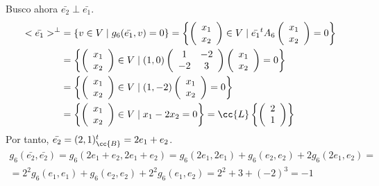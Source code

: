 \begin{ejercicio}
\begin{enumerate}
        Busco ahora $\bar{e_2} \perp \bar{e_1}$.
        \begin{equation*}\begin{split}
            <\bar{e_1}>^\perp &= \{v \in V \mid g_6(\bar{e_1},v) = 0\} 
            = \left\{ \left(\begin{array}{c}
                 x_1 \\ x_2
            \end{array} \right) \in V \mid \bar{e_1}^t A_6
            \left(\begin{array}{c}
                 x_1 \\ x_2
            \end{array} \right) = 0\right\} \\
            &= \left\{ \left(\begin{array}{c}
                 x_1 \\ x_2
            \end{array} \right) \in V \mid (1,0)\left(\begin{array}{cc}
                1 & -2 \\
                -2 & 3
            \end{array} \right) 
            \left(\begin{array}{c}
                 x_1 \\ x_2
            \end{array} \right) = 0\right\} \\
            &= \left\{ \left(\begin{array}{c}
                 x_1 \\ x_2
            \end{array} \right) \in V \mid (1,-2)
            \left(\begin{array}{c}
                 x_1 \\ x_2
            \end{array} \right) = 0\right\} \\
            &= \left\{ \left(\begin{array}{c}
                 x_1 \\ x_2
            \end{array} \right) \in V \mid x_1-2x_2 = 0\right\}
            = \cc{L} \left\{ \left(\begin{array}{c}
                 2 \\ 1
            \end{array} \right) \right\}
        \end{split}\end{equation*}
        Por tanto, $\bar{e_2} = (2,1)^t_\cc{B} = 2e_1+e_2$.
        \begin{multline*}
            g_6(\bar{e_2}, \bar{e_2}) = g_6(2e_1+e_2, 2e_1+e_2) = g_6(2e_1,2e_1) + g_6(e_2,e_2) + 2g_6(2e_1, e_2)
            =\\=
            2^2g_6(e_1, e_1) + g_6(e_2,e_2)+2^2g_6(e_1, e_2) = 2^2 + 3+(-2)^3 = -1
        \end{multline*}


\end{enumerate}
\end{ejercicio}
